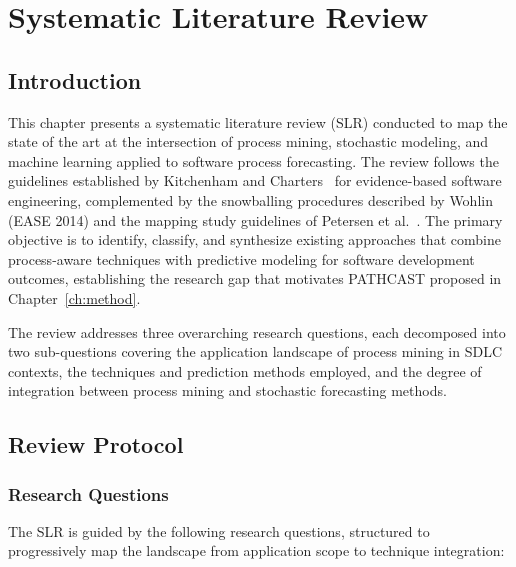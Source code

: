 \chapter{Systematic Literature Review}
\label{ch:slr}

\section{Introduction}
\label{sec:slr-intro}

This chapter presents a systematic literature review (SLR) conducted to map the state of the art at the intersection of process mining, stochastic modeling, and machine learning applied to software process forecasting. The review follows the guidelines established by Kitchenham and Charters~\cite{kitchenham2007} for evidence-based software engineering, complemented by the snowballing procedures described by Wohlin~\cite{wohlin2014guidelines} (EASE 2014) and the mapping study guidelines of Petersen et al.~\cite{petersen2015}. The primary objective is to identify, classify, and synthesize existing approaches that combine process-aware techniques with predictive modeling for software development outcomes, establishing the research gap that motivates PATHCAST proposed in Chapter~\ref{ch:method}.

The review addresses three overarching research questions, each decomposed into two sub-questions covering the application landscape of process mining in SDLC contexts, the techniques and prediction methods employed, and the degree of integration between process mining and stochastic forecasting methods.


\section{Review Protocol}
\label{sec:slr-protocol}

\subsection{Research Questions}
\label{sec:slr-rqs}

The SLR is guided by the following research questions, structured to progressively map the landscape from application scope to technique integration:

